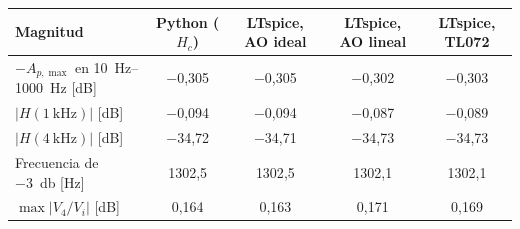 \begin{tabular}{@{}lcccc@{}}
\toprule
Magnitud & Python ($H_c$) & LTspice, AO ideal & LTspice, AO lineal & LTspice, TL072 \\
\midrule
$-A_{p,\max}$ en \qtyrange{10}{1000}{\hertz} [dB] & $-$0{,}305 & $-$0{,}305 & $-$0{,}302 & $-$0{,}303 \\
$|H(\qty{1}{\kilo\hertz})|$ [dB] & $-$0{,}094 & $-$0{,}094 & $-$0{,}087 & $-$0{,}089 \\
$|H(\qty{4}{\kilo\hertz})|$ [dB] & $-$34{,}72 & $-$34{,}71 & $-$34{,}73 & $-$34{,}73 \\
Frecuencia de \qty{-3}{\decibel} [Hz] & 1302{,}5 & 1302{,}5 & 1302{,}1 & 1302{,}1 \\
$\max|V_4/V_i|$ [dB] & 0{,}164 & 0{,}163 & 0{,}171 & 0{,}169 \\
\bottomrule
\end{tabular}